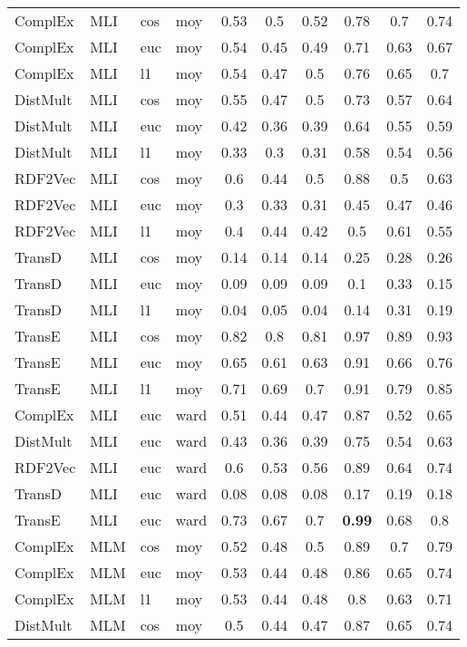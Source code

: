 \begin{longtable}{|llll|ccc|ccc|}
ComplEx	&	MLI	&	cos	&	moy	&	0.53	&	0.5	&	0.52	&	0.78	&	0.7	&	0.74 \\ 
ComplEx	&	MLI	&	euc	&	moy	&	0.54	&	0.45	&	0.49	&	0.71	&	0.63	&	0.67 \\ 
ComplEx	&	MLI	&	l1	&	moy	&	0.54	&	0.47	&	0.5	&	0.76	&	0.65	&	0.7 \\ 
DistMult	&	MLI	&	cos	&	moy	&	0.55	&	0.47	&	0.5	&	0.73	&	0.57	&	0.64 \\ 
DistMult	&	MLI	&	euc	&	moy	&	0.42	&	0.36	&	0.39	&	0.64	&	0.55	&	0.59 \\ 
DistMult	&	MLI	&	l1	&	moy	&	0.33	&	0.3	&	0.31	&	0.58	&	0.54	&	0.56 \\ 
RDF2Vec	&	MLI	&	cos	&	moy	&	0.6	&	0.44	&	0.5	&	0.88	&	0.5	&	0.63 \\ 
RDF2Vec	&	MLI	&	euc	&	moy	&	0.3	&	0.33	&	0.31	&	0.45	&	0.47	&	0.46 \\ 
RDF2Vec	&	MLI	&	l1	&	moy	&	0.4	&	0.44	&	0.42	&	0.5	&	0.61	&	0.55 \\ 
TransD	&	MLI	&	cos	&	moy	&	0.14	&	0.14	&	0.14	&	0.25	&	0.28	&	0.26 \\ 
TransD	&	MLI	&	euc	&	moy	&	0.09	&	0.09	&	0.09	&	0.1	&	0.33	&	0.15 \\ 
TransD	&	MLI	&	l1	&	moy	&	0.04	&	0.05	&	0.04	&	0.14	&	0.31	&	0.19 \\ 
TransE	&	MLI	&	cos	&	moy	&	0.82	&	0.8	&	0.81	&	0.97	&	0.89	&	0.93 \\ 
TransE	&	MLI	&	euc	&	moy	&	0.65	&	0.61	&	0.63	&	0.91	&	0.66	&	0.76 \\ 
TransE	&	MLI	&	l1	&	moy	&	0.71	&	0.69	&	0.7	&	0.91	&	0.79	&	0.85 \\ 
ComplEx	&	MLI	&	euc	&	ward	&	0.51	&	0.44	&	0.47	&	0.87	&	0.52	&	0.65 \\ 
DistMult	&	MLI	&	euc	&	ward	&	0.43	&	0.36	&	0.39	&	0.75	&	0.54	&	0.63 \\ 
RDF2Vec	&	MLI	&	euc	&	ward	&	0.6	&	0.53	&	0.56	&	0.89	&	0.64	&	0.74 \\ 
TransD	&	MLI	&	euc	&	ward	&	0.08	&	0.08	&	0.08	&	0.17	&	0.19	&	0.18 \\ 
TransE	&	MLI	&	euc	&	ward	&	0.73	&	0.67	&	0.7	&	\textbf{0.99}	&	0.68	&	0.8 \\
\hline
ComplEx	&	MLM	&	cos	&	moy	&	0.52	&	0.48	&	0.5	&	0.89	&	0.7	&	0.79 \\ 
ComplEx	&	MLM	&	euc	&	moy	&	0.53	&	0.44	&	0.48	&	0.86	&	0.65	&	0.74 \\ 
ComplEx	&	MLM	&	l1	&	moy	&	0.53	&	0.44	&	0.48	&	0.8	&	0.63	&	0.71 \\ 
DistMult	&	MLM	&	cos	&	moy	&	0.5	&	0.44	&	0.47	&	0.87	&	0.65	&	0.74 \\ 

\end{longtable}

